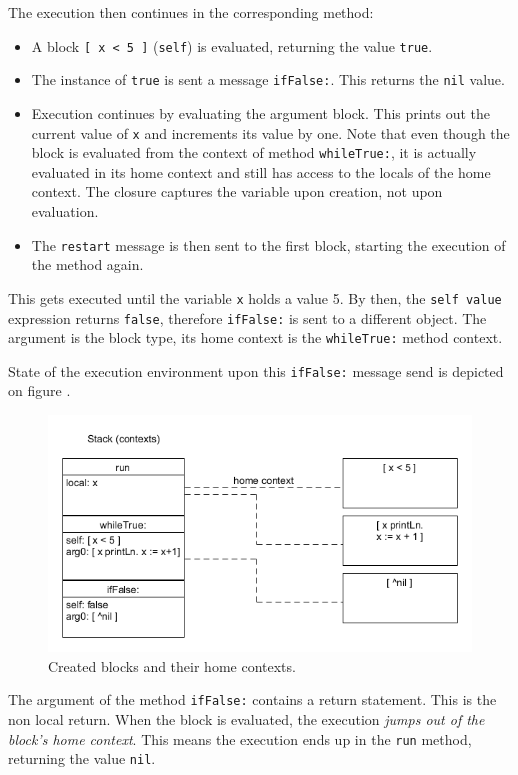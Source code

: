 \documentclass[thesis=M,english]{FITthesis}[2019/12/23]
\begin{document}
The execution then continues in the corresponding method:
\begin{itemize}
	\item A block \texttt{[ x < 5 ]} (\texttt{self}) is evaluated, returning the value \texttt{true}.
	\item The instance of \texttt{true} is sent a message \texttt{ifFalse:}. This returns the \texttt{nil} value.
	\item Execution continues by evaluating the argument block. This prints out the current value of \texttt{x} and
		increments its value by one. Note that even though the block is evaluated from the context of method
		\texttt{whileTrue:}, it is actually evaluated in its home context and still has access to the locals of 
		the home context. The closure captures the variable upon creation, not upon evaluation.
	\item The \texttt{restart} message is then sent to the first block, starting the execution of the method again.
\end{itemize}

This gets executed until the variable \texttt{x} holds a value 5. By then, the \texttt{self value} expression returns
\texttt{false}, therefore \texttt{ifFalse:} is sent to a different object. The argument is the block type, its home context
is the \texttt{whileTrue:} method context.

State of the execution environment upon this \texttt{ifFalse:} message send is depicted on figure .
\begin{figure}[h!]
	\centering
	\includegraphics[width=\linewidth]{media/nlreturn_ex1.png}
	\caption{Created blocks and their home contexts.}
	\label{fig:nlreturn_ctx_1}
\end{figure}

The argument of the method \texttt{ifFalse:} contains a return statement. This is the non local return. When the block is
evaluated, the execution \textit{jumps out of the block's home context}. This means the execution ends up in the \texttt{run}
method, returning the value \texttt{nil}.
\end{document}
